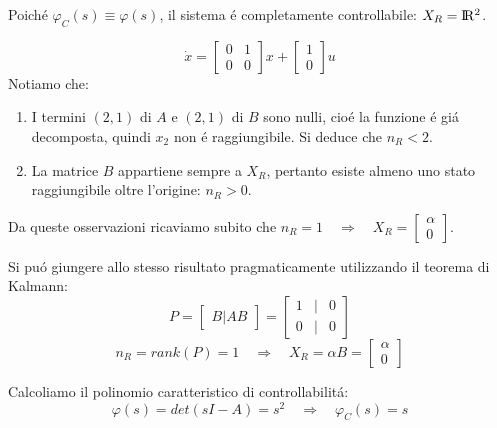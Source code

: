 \documentclass[../main.tex]{subfiles}
\begin{document}
\begin{mdframed}[style=Exercise]
\begin{Exercise}[title={Calcolare $ X_R $ e $ \varphi_C(s) $}, difficulty=1]
\begin{itemize}
						Poich\'e $ \varphi_C(s) \equiv \varphi(s) $, il sistema \'e completamente controllabile: $ X_R = \rm I\!R^2 $.
				\end{itemize}
			\end{Exercise}
		\end{mdframed}
	
		\begin{mdframed}[style=Exercise]
			\begin{Exercise}[title={Calcolare $ X_R $ e $ \varphi_C(s) $}, difficulty=1]
				\[
					\dot x =
					\begin{bmatrix}
						0 & 1\\
						0 & 0
					\end{bmatrix} x+
					\begin{bmatrix}
						1\\
						0
					\end{bmatrix} u
				\]
				Notiamo che:
				\begin{enumerate}
					\item
						I termini $ (2,1) $ di $ A $ e $ (2,1) $ di $ B $ sono nulli, cio\'e la funzione \'e gi\'a decomposta, quindi $ x_2 $ non \'e raggiungibile. Si deduce che $ n_R < 2 $.
					\item
						La matrice $ B $ appartiene sempre a $ X_R $, pertanto esiste almeno uno stato raggiungibile oltre l'origine: $ n_R > 0 $.
				\end{enumerate}
			
				Da queste osservazioni ricaviamo subito che $ n_R = 1 \quad\Rightarrow\quad X_R = \begin{bmatrix} \alpha\\ 0 \end{bmatrix} $.
				
				Si pu\'o giungere allo stesso risultato pragmaticamente utilizzando il teorema di Kalmann:
				\[
					P =
					\begin{bmatrix}
						B | AB
					\end{bmatrix} =
					\begin{bmatrix}
						1 & | & 0\\
						0 & | & 0
					\end{bmatrix}
				\]
				\[
					n_R = rank\left( P \right) = 1 \quad\Rightarrow\quad X_R = \alpha B =
					\begin{bmatrix}
						\alpha\\
						0
					\end{bmatrix}
				\]
				
				Calcoliamo il polinomio caratteristico di controllabilit\'a:
				\[
					\varphi(s) = det(sI-A) = s^2 \quad\Rightarrow\quad \varphi_C(s) = s
				\]
			\end{Exercise}
		\end{mdframed}
\end{document}

